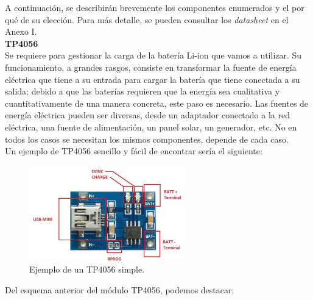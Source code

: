 \documentclass[12pt]{article}
\begin{document}
	\noindent A continuación, se describirán brevemente los componentes enumerados y el por qué de su elección. Para más detalle, se pueden consultar los \textit{datasheet} en el Anexo I. \\
	
	\noindent \textbf{TP4056} \\
	
	\noindent Se requiere para gestionar la carga de la batería Li-ion que vamos a utilizar.  Su funcionamiento, a grandes rasgos, consiste en transformar la fuente de energía eléctrica que tiene a su entrada para cargar la batería que tiene conectada a su salida; debido a que las baterías requieren que la energía sea cualitativa y cuantitativamente de una manera concreta, este paso es necesario. Las fuentes de energía eléctrica pueden ser diversas, desde un adaptador conectado a la red eléctrica, una fuente de alimentación, un panel solar, un generador, etc. No en todos los casos se necesitan los mismos componentes, depende de cada caso.\\
	
	\noindent Un ejemplo de TP4056 sencillo y fácil de encontrar sería el siguiente:  \\
		
	\begin{figure}[h]
		\begin{center}
			\includegraphics[width=0.6\textwidth]{img/tp4056_withoutBoost.png}
			\caption{Ejemplo de un TP4056 simple.}
			\label{TP4056 sin boost}
		\end{center}
	\end{figure}
	
	\noindent Del esquema anterior del módulo TP4056, podemos destacar: \\
	
\end{document}
